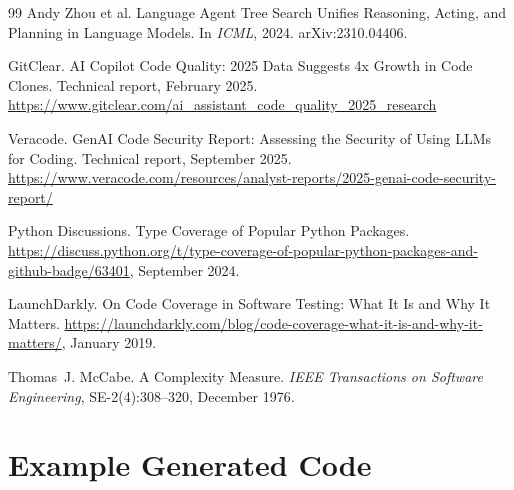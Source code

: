 \documentclass[11pt]{article}
\begin{document}
\begin{thebibliography}{99}
Andy Zhou et al.
\newblock Language Agent Tree Search Unifies Reasoning, Acting, and Planning in Language Models.
\newblock In \emph{ICML}, 2024.
\newblock arXiv:2310.04406.

GitClear.
\newblock AI Copilot Code Quality: 2025 Data Suggests 4x Growth in Code Clones.
\newblock Technical report, February 2025.
\newblock \url{https://www.gitclear.com/ai_assistant_code_quality_2025_research}

Veracode.
 GenAI Code Security Report: Assessing the Security of Using LLMs for Coding.
\newblock Technical report, September 2025.
\newblock \url{https://www.veracode.com/resources/analyst-reports/2025-genai-code-security-report/}

Python Discussions.
\newblock Type Coverage of Popular Python Packages.
\newblock \url{https://discuss.python.org/t/type-coverage-of-popular-python-packages-and-github-badge/63401}, September 2024.

LaunchDarkly.
\newblock On Code Coverage in Software Testing: What It Is and Why It Matters.
\newblock \url{https://launchdarkly.com/blog/code-coverage-what-it-is-and-why-it-matters/}, January 2019.

Thomas~J. McCabe.
\newblock A Complexity Measure.
\newblock \emph{IEEE Transactions on Software Engineering}, SE-2(4):308--320, December 1976.

\end{thebibliography}


\appendix

\section{Example Generated Code}
\label{app:example}
\end{document}
